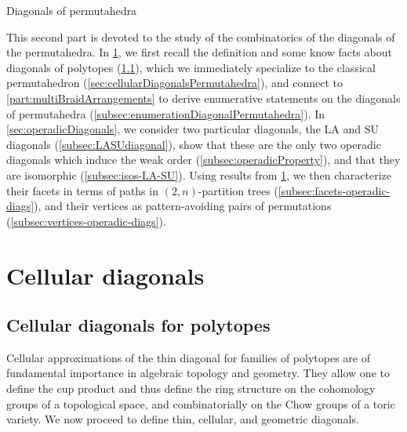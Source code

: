\documentclass{amsart}
\makeatletter
\newcommand{\vincent}[1]{\todo[color=blue!30]{\rm #1 \\ \hfill --- V.}}
\theoremstyle{definition}
\newcommand{\SU}{\mathrm{SU}}
\newcommand{\LA}{\mathrm{LA}}
\def\part{\@startsection{part}{1}%
\z@{.7\linespacing\@plus\linespacing}{.8\linespacing}%
{\LARGE\sffamily\centering}}
\makeatother
\begin{document}

\clearpage
\part{Diagonals of permutahedra}
\label{part:diagonalsPermutahedra}

This second part is devoted to the study of the combinatorics of the diagonals of the permutahedra.
In \cref{sec:cellularDiagonals}, we first recall the definition and some know facts about diagonals of polytopes (\cref{subsec:cellularDiagonalsPolytopes}), which we immediately specialize to the classical permutahedron (\cref{sec:cellularDiagonalsPermutahedra}), and connect to \cref{part:multiBraidArrangements} to derive enumerative statements on the diagonals of permutahedra (\cref{subsec:enumerationDiagonalPermutahedra}).
In \cref{sec:operadicDiagonals}, we consider two particular diagonals, the $\LA$ and $\SU$ diagonals (\cref{subsec:LASUdiagonal}), show that these are the only two operadic diagonals which induce the weak order (\cref{subsec:operadicProperty}), and that they are isomorphic (\cref{subsec:isos-LA-SU}). 
Using results from \cref{sec:cellularDiagonals}, we then characterize their facets in terms of paths in $(2,n)$-partition trees (\cref{subsec:facets-operadic-diags}), and their vertices as pattern-avoiding pairs of permutations (\cref{subsec:vertices-operadic-diags}).

\vincent{To complete}


\section{Cellular diagonals}
\label{sec:cellularDiagonals}


\subsection{Cellular diagonals for polytopes}
\label{subsec:cellularDiagonalsPolytopes}
 
Cellular approximations of the thin diagonal for families of polytopes are of fundamental importance in algebraic topology and geometry.
They allow one to define the cup product and thus define the ring structure on the cohomology groups of a topological space, and combinatorially on the Chow groups of a toric variety. 
We now proceed to define thin, cellular, and geometric diagonals.
\end{document}
